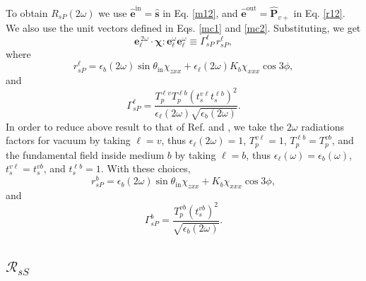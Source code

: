 \documentclass[10pt]{article}
\begin{document}
To obtain $R_{sP}(2\omega)$ we use
$\hat{\mathbf{e}}^{\mathrm{in}}=\hat{\mathbf{s}}$ in Eq. \eqref{m12}, and
$\hat{\mathbf{e}}^{\mathrm{out}}=\hat{\mathbf{P}}_{v+}$ in Eq. \eqref{r12}. We
also use the unit vectors defined in Eqs. \eqref{mc1} and
\eqref{mc2}. Substituting, we get
\begin{equation*}
\mathbf{e}^{\,2\omega}_{\ell}\cdot
\boldsymbol{\chi}:\mathbf{e}^\omega_{\ell}\mathbf{e}^\omega_{\ell}
\equiv\Gamma^{\ell}_{sP}\, r^{\ell}_{sP},
\end{equation*}
where
\begin{equation}
r^{\ell}_{sP}
= \epsilon_{b}(2\omega)\sin\theta_{\mathrm{in}}\chi_{zxx}
+ \epsilon_{\ell}(2\omega)K_{b}\chi_{xxx}\cos3\phi,
\end{equation} 
and  
\begin{equation}
\Gamma^{\ell}_{sP}=
\frac{T_{p}^{\ell v}T^{\ell b}_{p}\left(t_s^{v\ell}t^{\ell b}_s\right)^2}
     {\epsilon_{\ell}(2\omega)\sqrt{\epsilon_{b}(2\omega)}}.  
\end{equation} 
In order to reduce above result to that of Ref. \cite{mizrahiJOSA88} and
\cite{sipePRB87}, we take the $2\omega$ radiations factors for vacuum by
taking $\ell=v$, thus $\epsilon_{\ell}(2\omega)=1$, $T^{v\ell}_{p}=1$,
$T^{\ell b}_{p}=T^{vb}_{p}$, and the fundamental field inside medium $b$ by
taking $\ell=b$, thus $\epsilon_{\ell}(\omega)=\epsilon_{b}(\omega)$,
$t^{v\ell}_s=t^{vb}_s$, and $t^{\ell b}_s=1$. With these choices,
\begin{equation*}
r^{b}_{sP} = \epsilon_{b}(2\omega)\sin\theta_{\mathrm{in}}\chi_{zxx}
+ K_{b}\chi_{xxx}\cos3\phi,
\end{equation*} 
and 
\begin{equation*}
\Gamma^{b}_{sP} =
\frac{T^{v b}_{p}(t_s^{vb})^{2}}{\sqrt{\epsilon_{b}(2\omega)}}.  
\end{equation*}


\subsection{\texorpdfstring{$\mathcal{R}_{sS}$}{RsS}}
\end{document}
